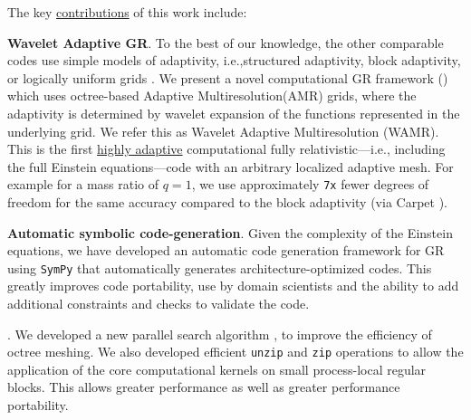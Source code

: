 \documentclass[10pt, conference]{IEEEtran} %
\begin{document}
 


\noindent The key \ul{contributions} of this work include:

\vspace{0.1in}    
\noindent \textbf{Wavelet Adaptive GR}. 
To the best of our knowledge, the other comparable codes use simple models of adaptivity, i.e.,structured adaptivity, block adaptivity, or logically uniform grids \cite{EINSTEIN_TOOLKIT,Neilsen:2014hha,Bruegmann:2006at,Yamamoto:2008js}. We present a novel computational GR framework (\dendrogr)  which uses octree-based Adaptive Multiresolution(AMR) grids, where the adaptivity is determined by wavelet expansion \cite{Vasilyev1995,Vasilyev1996,Paolucci1,Paolucci2,Holmstrom1999} of the functions represented in the underlying grid. We refer this as Wavelet Adaptive Multiresolution (WAMR). This is the first \ul{highly adaptive} computational fully relativistic---i.e., including the full Einstein equations---code with an arbitrary localized 
adaptive mesh. For example for a mass ratio of $q=1$, we use approximately \texttt{7x} fewer degrees of freedom for the same accuracy compared to the block adaptivity (via Carpet \cite{CARPET}).

\noindent \textbf{Automatic symbolic code-generation}. Given the complexity of the Einstein equations, we have developed an automatic code generation framework for GR using \texttt{SymPy} that automatically generates architecture-optimized codes. This greatly improves code portability, use by domain scientists and the ability to add additional constraints and checks to validate the code.

\noindent \textbf{\tsearch}. We developed a new parallel search algorithm \tsearch, to improve the efficiency of octree meshing. We also developed efficient \texttt{unzip} and \texttt{zip} operations to allow the application of the core computational kernels on small process-local regular blocks. This allows greater performance as well as greater performance portability. 
\end{document}
